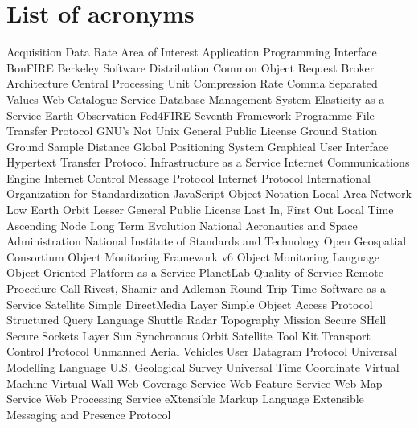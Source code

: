 \chapter{List of acronyms}

{\small
\begin{acronym}[XXXXXXXX]
     {Acquisition Data Rate}
      {Area of Interest}
   {Application Programming Interface}
       {BonFIRE}
   {Berkeley Software Distribution}
   {Common Object Request Broker Architecture}
     {Central Processing Unit}
      {Compression Rate}
     {Comma Separated Values}
       {Web Catalogue Service}
    {Database Management System}
    {Elasticity as a Service}
   {Earth Observation}
       {Fed4FIRE}
   {Seventh Framework Programme}
     {File Transfer Protocol}
       {\acs{GNU}'s Not Unix}
   {General Public License}
      {Ground Station}
   {Ground Sample Distance}
   {Global Positioning System}
   {Graphical User Interface}
    {Hypertext Transfer Protocol}
   {Infrastructure as a Service}
   {Internet Communications Engine}
   {Internet Control Message Protocol}
   {Internet Protocol}
   {International Organization for Standardization}
   {JavaScript Object Notation}
   {Local Area Network}
   {Low Earth Orbit}
   {Lesser General Public License}
    {Last In, First Out}
   {Local Time Ascending Node}
   {Long Term Evolution}
   {National Aeronautics and Space Administration}
   {National Institute of Standards and Technology}
   {Open Geospatial Consortium}
   {Object Monitoring Framework v6}
   {Object Monitoring Language}
        {Object Oriented}
   {Platform as a Service}
      {PlanetLab}
   {Quality of Service}
       {Remote Procedure Call}
   {Rivest, Shamir and Adleman}
   {Round Trip Time}
   {Software as a Service}
     {Satellite}
   {Simple DirectMedia Layer}
   {Simple Object Access Protocol}
     {Structured Query Language}
   {Shuttle Radar Topography Mission}
   {Secure SHell}
   {Secure Sockets Layer}
   {Sun Synchronous Orbit}
     {Satellite Tool Kit}
   {Transport Control Protocol}
   {Unmanned Aerial Vehicles}
   {User Datagram Protocol}
     {Universal Modelling Language}
   {U.S. Geological Survey}
     {Universal Time Coordinate}
      {Virtual Machine}
      {Virtual Wall}
   {Web Coverage Service}
   {Web Feature Service}
   {Web Map Service}
   {Web Processing Service}
      {eXtensible Markup Language}
   {Extensible Messaging and Presence Protocol}
\end{acronym}
}


